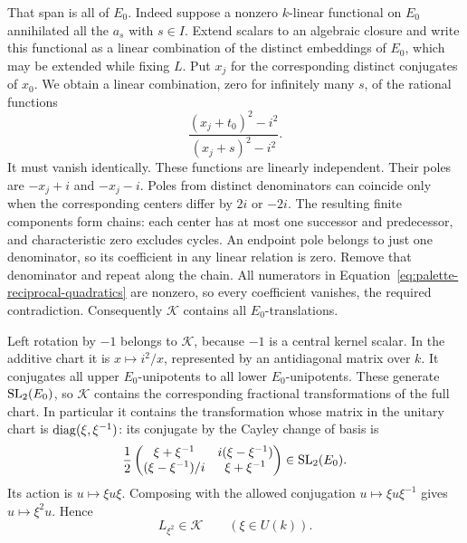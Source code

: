 That span is all of $E_0$. Indeed suppose a nonzero $k$-linear
functional on $E_0$ annihilated all the $a_s$ with $s\in I$.
Extend scalars to an algebraic closure and write this functional as a
linear combination of the distinct embeddings of $E_0$, which may be
extended while fixing $L$. Put $x_j$ for the corresponding distinct
conjugates of $x_0$. We obtain a linear combination, zero for infinitely
many $s$, of the rational functions
\begin{equation}\label{eq:palette-reciprocal-quadratics}
 \frac{(x_j+t_0)^2-i^2}{(x_j+s)^2-i^2}.
\end{equation}
It must vanish identically. These functions are linearly independent.
Their poles are $-x_j+i$ and $-x_j-i$. Poles from distinct denominators
can coincide only when the corresponding centers differ by $2i$ or
$-2i$. The resulting finite components form chains: each center has at
most one successor and predecessor, and characteristic zero excludes
cycles. An endpoint pole belongs to just one denominator, so its
coefficient in any linear relation is zero. Remove that denominator
and repeat along the chain. All numerators in
Equation~\ref{eq:palette-reciprocal-quadratics} are nonzero, so every
coefficient vanishes, the required contradiction. Consequently
$\mathcal K$ contains all $E_0$-translations.

Left rotation by $-1$ belongs to $\mathcal K$, because $-1$ is a central
kernel scalar. In the additive chart it is $x\mapsto i^2/x$, represented
by an antidiagonal matrix over $k$. It conjugates all upper
$E_0$-unipotents to all lower $E_0$-unipotents. These generate
$\operatorname{SL}_2(E_0)$, so $\mathcal K$ contains the corresponding fractional
transformations of the full chart. In particular it contains the
transformation whose matrix in the unitary chart is
$\operatorname{diag}(\xi,\xi^{-1})$: its conjugate by the Cayley change of basis is
\[
 \frac12
 \begin{pmatrix}
 \xi+\xi^{-1}&i(\xi-\xi^{-1})\\
 (\xi-\xi^{-1})/i&\xi+\xi^{-1}
 \end{pmatrix}\in\operatorname{SL}_2(E_0).
\]
Its action is $u\mapsto\xi u\xi$. Composing with the allowed conjugation
$u\mapsto\xi u\xi^{-1}$ gives $u\mapsto\xi^2u$. Hence
\begin{equation}\label{eq:palette-left-squares}
 L_{\xi^2}\in\mathcal K\qquad(\xi\in U(k)).
\end{equation}

